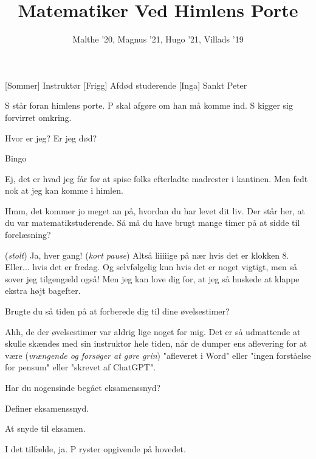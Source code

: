 \documentclass[a4paper,11pt]{article}
\title{Matematiker Ved Himlens Porte}
\author{Malthe '20, Magnus '21, Hugo '21, Villads '19}
\begin{document}
\maketitle

\begin{roles}
[Sommer] Instruktør
[Frigg] Afdød studerende
[Inga] Sankt Peter
\end{roles}

\begin{sketch}
\scene S står foran himlens porte. P skal afgøre om han må komme ind. S kigger sig forvirret omkring.

 Hvor er jeg? Er jeg død? 

 Bingo

 Ej, det er hvad jeg får for at spise folks efterladte madrester i kantinen. Men fedt nok at jeg kan komme i himlen. 

 Hmm, det kommer jo meget an på, hvordan du har levet dit liv. Der står her, at du var matematikstuderende. Så må du have brugt mange timer på at sidde til forelæsning?

 (\textit{stolt}) Ja, hver gang! (\textit{kort pause}) Altså liiiiige på nær hvis det er klokken 8. Eller... hvis det er fredag. Og selvfølgelig kun hvis det er noget vigtigt, men så sover jeg tilgengæld også! Men jeg kan love dig for, at jeg så huskede at klappe ekstra højt bagefter. 

 Brugte du så tiden på at forberede dig til dine øvelsestimer?

 Ahh, de der øvelsestimer var aldrig lige noget for mig. Det er så udmattende at skulle skændes med sin instruktor hele tiden, når de dumper ens aflevering for at være (\textit{vrængende og forsøger at gøre grin}) "afleveret i Word" eller "ingen forståelse for pensum" eller "skrevet af ChatGPT". 

 Har du nogensinde begået eksamenssnyd?

 Definer eksamenssnyd.

 At snyde til eksamen.

 I det tilfælde, ja.
\scene P ryster opgivende på hovedet.




\end{sketch}
\end{document}
